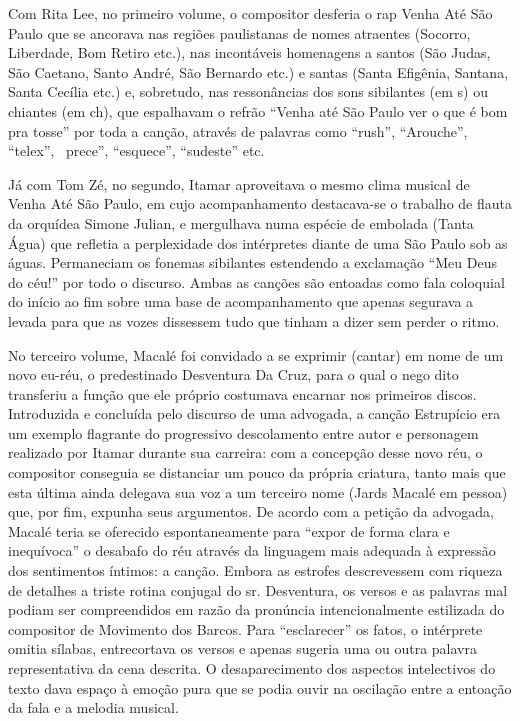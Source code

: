 Com Rita Lee, no primeiro volume, o compositor desferia o rap Venha Até
São Paulo que se ancorava nas regiões paulistanas de nomes atraentes
(Socorro, Liberdade, Bom Retiro etc.), nas incontáveis homenagens a
santos (São Judas, São Caetano, Santo André, São Bernardo etc.) e santas
(Santa Efigênia, Santana, Santa Cecília etc.) e, sobretudo, nas
ressonâncias dos sons sibilantes (em s) ou chiantes (em ch), que
espalhavam o refrão ``Venha até São Paulo ver o que é bom pra tosse''
por toda a canção, através de palavras como ``rush'', ``Arouche'',
``telex'',~ prece'', ``esquece'', ``sudeste'' etc.

Já com Tom Zé, no segundo, Itamar aproveitava o mesmo clima musical de
Venha Até São Paulo, em cujo acompanhamento destacava-se o trabalho de
flauta da orquídea Simone Julian, e mergulhava numa espécie de embolada
(Tanta Água) que refletia a perplexidade dos intérpretes diante de uma
São Paulo sob as águas. Permaneciam os fonemas sibilantes estendendo a
exclamação ``Meu Deus do céu!'' por todo o discurso. Ambas as canções
são entoadas como fala coloquial do início ao fim sobre uma base de
acompanhamento que apenas segurava a levada para que as vozes dissessem
tudo que tinham a dizer sem perder o ritmo.

No terceiro volume, Macalé foi convidado a se exprimir (cantar) em nome
de um novo eu-réu, o predestinado Desventura Da Cruz, para o qual o nego
dito transferiu a função que ele próprio costumava encarnar nos
primeiros discos. Introduzida e concluída pelo discurso de uma advogada,
a canção Estrupício era um exemplo flagrante do progressivo descolamento
entre autor e personagem realizado por Itamar durante sua carreira: com
a concepção desse novo réu, o compositor conseguia se distanciar um
pouco da própria criatura, tanto mais que esta última ainda delegava sua
voz a um terceiro nome (Jards Macalé em pessoa) que, por fim, expunha
seus argumentos. De acordo com a petição da advogada, Macalé teria se
oferecido espontaneamente para ``expor de forma clara e inequívoca'' o
desabafo do réu através da linguagem mais adequada à expressão dos
sentimentos íntimos: a canção. Embora as estrofes descrevessem com
riqueza de detalhes a triste rotina conjugal do sr. Desventura, os
versos e as palavras mal podiam ser compreendidos em razão da pronúncia
intencionalmente estilizada do compositor de Movimento dos Barcos. Para
``esclarecer'' os fatos, o intérprete omitia sílabas, entrecortava os
versos e apenas sugeria uma ou outra palavra representativa da cena
descrita. O desaparecimento dos aspectos intelectivos do texto dava
espaço à emoção pura que se podia ouvir na oscilação entre a entoação da
fala e a melodia musical.

